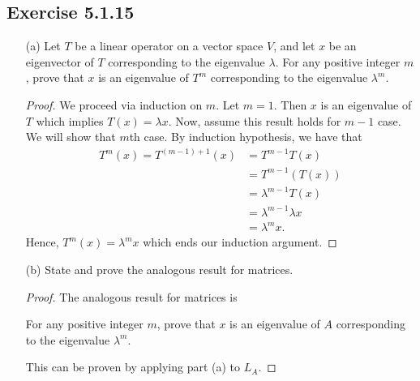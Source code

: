 \subsection*{Exercise 5.1.15} 
\begin{enumerate}
    \item[(a)] Let \( T  \) be a linear operator on a vector space \( V  \), and let \( x  \) be an eigenvector of \( T  \) corresponding to the eigenvalue \( \lambda  \). For any positive integer \( m  \), prove that \( x  \) is an eigenvalue of \( T^{m} \) corresponding to the eigenvalue \( \lambda^{m} \).
        \begin{proof}
         We proceed via induction on \( m  \). Let \( m = 1 \). Then \( x  \) is an eigenvalue of \( T  \) which implies \( T(x) = \lambda x  \). Now, assume this result holds for \( m - 1  \) case. We will show that \( m \)th case. By induction hypothesis, we have that  \begin{align*}
             T^{m}(x) = T^{(m-1) + 1}(x) &= T^{m-1} T (x) \\
                                         &= T^{m-1} (T(x)) \\
                                         &= \lambda^{m-1} T(x) \\
                                         &= \lambda^{m-1} \lambda x \\
                                         &= \lambda^{m} x.
         \end{align*}     
         Hence, \( T^{m}(x) = \lambda^{m} x \) which ends our induction argument.
        \end{proof}
    \item[(b)] State and prove the analogous result for matrices.
        \begin{proof}
        The analogous result for matrices is  
        \begin{center}
            For any positive integer \( m  \), prove that \( x  \) is an eigenvalue of \( A \) corresponding to the eigenvalue \( \lambda^{m} \).
        \end{center}
        This can be proven by applying part (a) to \( {L}_{A} \).
        \end{proof}
\end{enumerate}

